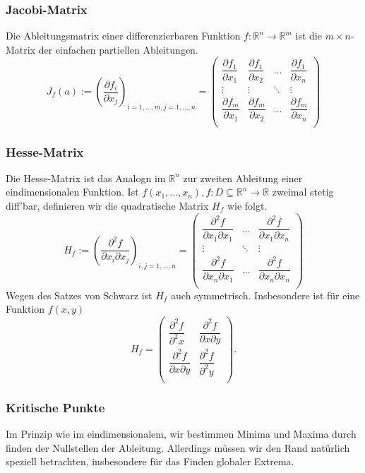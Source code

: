 \documentclass[a4paper, 9pt, DIV=24]{scrartcl}
\newcommand{\R}{\mathbb{R}}
\begin{document}
\subsubsection{Jacobi-Matrix}
Die Ableitungsmatrix einer differenzierbaren Funktion $f: \R^n \rightarrow \R^m$ ist die $m\times n$-Matrix der einfachen partiellen Ableitungen.
\[
 J_f(a) := (\dfrac{\partial f_i}{\partial x_j})_{i = 1,\dots,m, j = 1,\dots,n} =
 \begin{pmatrix}
  \dfrac{\partial f_1}{\partial x_1} & \dfrac{\partial f_1}{\partial x_2} & \dots & \dfrac{\partial f_1}{\partial x_n} \\
  \vdots & \vdots & \ddots & \vdots \\
  \dfrac{\partial f_m}{\partial x_1} & \dfrac{\partial f_m}{\partial x_2} & \dots & \dfrac{\partial f_m}{\partial x_n} \\
 \end{pmatrix}\]

\subsubsection{Hesse-Matrix}
Die Hesse-Matrix ist das Analogn im $\R^n$ zur zweiten Ableitung einer eindimensionalen Funktion.
Ist $f(x_1,\dots,x_n), f: D \subseteq \R^n \rightarrow \R$ zweimal stetig diff'bar, definieren wir die quadratische Matrix $H_f$ wie folgt.
\[ H_f := (\dfrac{\partial^2 f}{\partial x_i\partial x_j})_{i,j=1,\dots,n} = \begin{pmatrix}
 \dfrac{\partial^2 f}{\partial x_1\partial x_1} & \dots & \dfrac{\partial^2 f}{\partial x_1\partial x_n} \\
 \vdots & \ddots & \vdots \\
 \dfrac{\partial^2 f}{\partial x_n\partial x_1} & \dots & \dfrac{\partial^2 f}{\partial x_n\partial x_n} \\
\end{pmatrix}
\]
Wegen des Satzes von Schwarz ist $H_f$ auch symmetrisch.
Insbesondere ist für eine Funktion $f(x,y)$
\[ H_f = \begin{pmatrix}
\dfrac{\partial^2 f}{\partial^2 x} & \dfrac{\partial^2 f}{\partial x\partial y} \\
\dfrac{\partial^2 f}{\partial x\partial y} & \dfrac{\partial^2 f}{\partial^2 y} \\
\end{pmatrix}. \]

\subsubsection{Kritische Punkte}
Im Prinzip wie im eindimensionalem, wir bestimmen Minima und Maxima durch finden der Nullstellen der Ableitung.
Allerdings müssen wir den Rand natürlich speziell betrachten, insbesondere für das Finden globaler Extrema.
\end{document}
